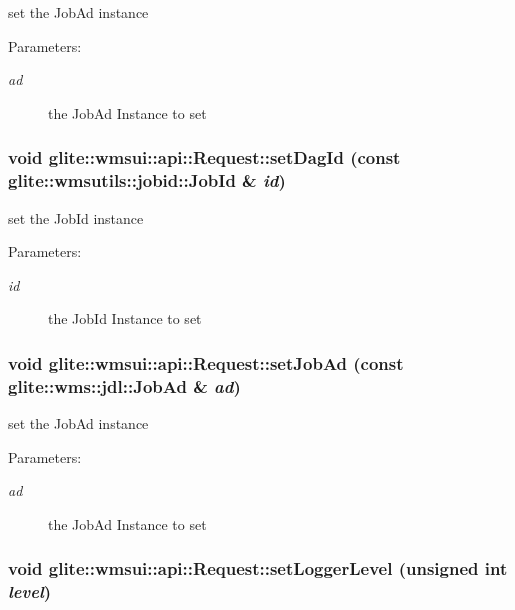 set the Job\-Ad instance \begin{Desc}
\item[Parameters:]
\begin{description}
\item[{\em ad}]the Job\-Ad Instance to set \end{description}
\end{Desc}
\hypertarget{classglite_1_1wmsui_1_1api_1_1Request_z11_5}{
\subsubsection[setDagId]{\setlength{\rightskip}{0pt plus 5cm}void glite::wmsui::api::Request::set\-Dag\-Id (const glite::wmsutils::jobid::Job\-Id \& {\em id})}}
\label{classglite_1_1wmsui_1_1api_1_1Request_z11_5}


set the Job\-Id instance \begin{Desc}
\item[Parameters:]
\begin{description}
\item[{\em id}]the Job\-Id Instance to set \end{description}
\end{Desc}
\hypertarget{classglite_1_1wmsui_1_1api_1_1Request_z11_3}{
\subsubsection[setJobAd]{\setlength{\rightskip}{0pt plus 5cm}void glite::wmsui::api::Request::set\-Job\-Ad (const glite::wms::jdl::Job\-Ad \& {\em ad})}}
\label{classglite_1_1wmsui_1_1api_1_1Request_z11_3}


set the Job\-Ad instance \begin{Desc}
\item[Parameters:]
\begin{description}
\item[{\em ad}]the Job\-Ad Instance to set \end{description}
\end{Desc}
\hypertarget{classglite_1_1wmsui_1_1api_1_1Request_z11_2}{
\subsubsection[setLoggerLevel]{\setlength{\rightskip}{0pt plus 5cm}void glite::wmsui::api::Request::set\-Logger\-Level (unsigned int {\em level})}}
\label{classglite_1_1wmsui_1_1api_1_1Request_z11_2}


